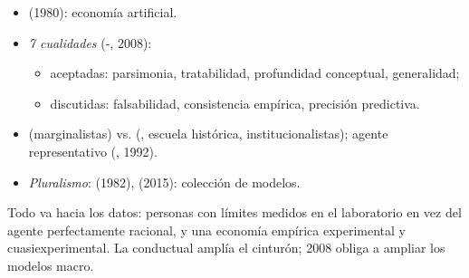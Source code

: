 \documentclass{article}
\begin{document}
\begin{columnas}
\begin{itemize}
\end{itemize}
\begin{itemize}
\item {} (1980): economía artificial.
\item \emph{7 cualidades} (-, 2008):
  \begin{itemize}
  \item aceptadas: parsimonia, tratabilidad, profundidad conceptual, generalidad;
  \item discutidas: falsabilidad, consistencia empírica, precisión predictiva.
  \end{itemize}
\end{itemize}
\begin{itemize}
\item {} (marginalistas) vs.  (, escuela histórica, institucionalistas); agente representativo (, 1992).
\item \emph{Pluralismo}:  (1982),  (2015): colección de modelos.
\end{itemize}

\begin{ideaclave}
Todo va hacia los datos: personas con límites medidos en el laboratorio en vez del agente perfectamente racional, y una economía empírica experimental y cuasiexperimental. La conductual amplía el cinturón; 2008 obliga a ampliar los modelos macro.
\end{ideaclave}


\end{columnas}
\end{document}
